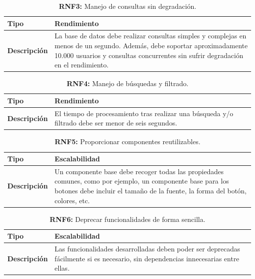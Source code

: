 \documentclass[a4paper, 12pt]{article}
\begin{document}
\begin{table}[H]
\captionsetup{list=no}%
\captionsetup{justification=raggedright,singlelinecheck=false}
\captionsetup{labelformat=empty}
\caption{\textbf{RNF3:} Manejo de consultas sin degradación.}
\label{tab:RNF3}
    \begin{tabular}{|m{5cm}|m{10cm}|}
	    \hline
	    \textbf{Tipo} & Rendimiento \\ 
	    \hline
	    \textbf{Descripción} & La base de datos debe realizar consultas simples y complejas en menos de un segundo. Además, debe soportar aproximadamente 10.000 usuarios y consultas concurrentes sin sufrir degradación en el rendimiento. \\ 
	    \hline
    \end{tabular}
\end{table}

\begin{table}[H]
\captionsetup{list=no}%
\captionsetup{justification=raggedright,singlelinecheck=false}
\captionsetup{labelformat=empty}
\caption{\textbf{RNF4:} Manejo de búsquedas y filtrado.}
\label{tab:RNF4}
    \begin{tabular}{|m{5cm}|m{10cm}|}
	    \hline
	    \textbf{Tipo} & Rendimiento \\ 
	    \hline
	    \textbf{Descripción} & El tiempo de procesamiento tras realizar una búsqueda y/o filtrado debe ser menor de seis segundos. \\ 
	    \hline
    \end{tabular}
\end{table}

\begin{table}[H]
\captionsetup{list=no}%
\captionsetup{justification=raggedright,singlelinecheck=false}
\captionsetup{labelformat=empty}
\caption{\textbf{RNF5:} Proporcionar componentes reutilizables.}
\label{tab:RNF5}
    \begin{tabular}{|m{5cm}|m{10cm}|}
	    \hline
	    \textbf{Tipo} & Escalabilidad \\ 
	    \hline
	    \textbf{Descripción} & Un componente base debe recoger todas las propiedades comunes, como por ejemplo, un componente base para los botones debe incluir el tamaño de la fuente, la forma del botón, colores, etc. \\ 
	    \hline
    \end{tabular}
\end{table}

\begin{table}[H]
\captionsetup{list=no}%
\captionsetup{justification=raggedright,singlelinecheck=false}
\captionsetup{labelformat=empty}
\caption{\textbf{RNF6:} Deprecar funcionalidades de forma sencilla.}
\label{tab:RNF6}
    \begin{tabular}{|m{5cm}|m{10cm}|}
	    \hline
	    \textbf{Tipo} & Escalabilidad \\ 
	    \hline
	    \textbf{Descripción} & Las funcionalidades desarrolladas deben poder ser deprecadas fácilmente si es necesario, sin dependencias innecesarias entre ellas. \\ 
	    \hline
    \end{tabular}
\end{table}
\end{document}
